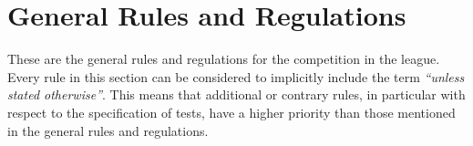 \chapter{General Rules and Regulations}
\label{chap:rules}

These are the general rules and regulations for the competition in the \RoboCup\AtHome{} league.
Every rule in this section can be considered to implicitly include the term \emph{\enquote{unless stated otherwise}}.
This means that additional or contrary rules, in particular with respect to the specification of tests, have a higher priority than those mentioned in the general rules and regulations.

%

%



%

%

%

%



%

%
